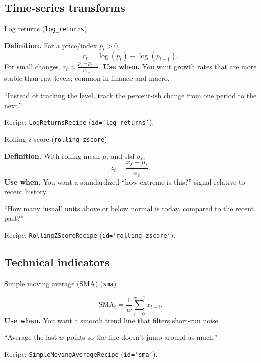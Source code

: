 \documentclass[11pt]{article}
\begin{document}
\subsection{Time-series transforms}

\begin{ConceptBox}{Log returns (\texttt{log\_returns})}
\begin{ClassroomBox}
\textbf{Definition.} For a price/index \(p_t>0\),
\[
r_t = \log(p_t) - \log(p_{t-1}).
\]
For small changes, \(r_t \approx \frac{p_t-p_{t-1}}{p_{t-1}}\).
\textbf{Use when.} You want growth rates that are more stable than raw levels; common in finance and macro.
\end{ClassroomBox}
\begin{IntuitionBox}
“Instead of tracking the level, track the percent-ish change from one period to the next.”
\end{IntuitionBox}
\begin{WhereBox}
Recipe: \texttt{LogReturnsRecipe} (\texttt{id='log\_returns'}).
\end{WhereBox}
\end{ConceptBox}

\begin{ConceptBox}{Rolling z-score (\texttt{rolling\_zscore})}
\begin{ClassroomBox}
\textbf{Definition.} With rolling mean \(\mu_t\) and std \(\sigma_t\),
\[
z_t = \frac{x_t-\mu_t}{\sigma_t}.
\]
\textbf{Use when.} You want a standardized “how extreme is this?” signal relative to recent history.
\end{ClassroomBox}
\begin{IntuitionBox}
“How many ‘usual’ units above or below normal is today, compared to the recent past?”
\end{IntuitionBox}
\begin{WhereBox}
Recipe: \texttt{RollingZScoreRecipe} (\texttt{id='rolling\_zscore'}).
\end{WhereBox}
\end{ConceptBox}

\subsection{Technical indicators}

\begin{ConceptBox}{Simple moving average (SMA) (\texttt{sma})}
\begin{ClassroomBox}
\[
\mathrm{SMA}_t = \frac{1}{w}\sum_{i=0}^{w-1} x_{t-i}.
\]
\textbf{Use when.} You want a smooth trend line that filters short-run noise.
\end{ClassroomBox}
\begin{IntuitionBox}
“Average the last \(w\) points so the line doesn’t jump around as much.”
\end{IntuitionBox}
\begin{WhereBox}
Recipe: \texttt{SimpleMovingAverageRecipe} (\texttt{id='sma'}).
\end{WhereBox}
\end{ConceptBox}
\end{document}
